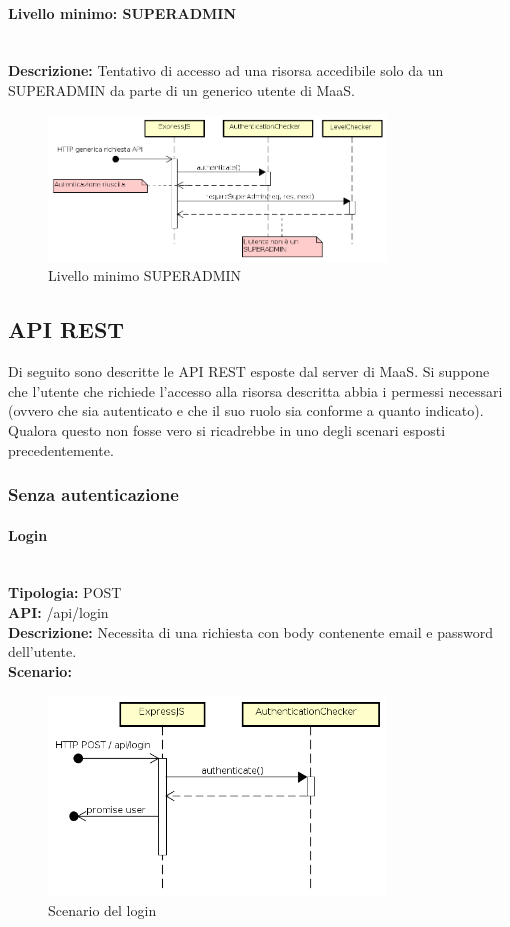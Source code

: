 \paragraph{Livello minimo: SUPERADMIN}  \mbox{} \\
\textbf{Descrizione:} Tentativo di accesso ad una risorsa accedibile solo da un SUPERADMIN da parte di un generico utente di MaaS.
\begin{figure}[H]
\centering
\includegraphics[width=0.8\textwidth]{res/sections/backend/sequence/requireSuperAdminFallita.png}
\caption{Livello minimo SUPERADMIN}
\end{figure}
\newpage
\subsection{API REST}
Di seguito sono descritte le API REST esposte dal server di MaaS. Si suppone che l'utente che richiede l'accesso alla risorsa descritta abbia i permessi necessari (ovvero che sia autenticato e che il suo ruolo sia conforme a quanto indicato). Qualora questo non fosse vero si ricadrebbe in uno degli scenari esposti precedentemente.
\subsubsection{Senza autenticazione}
\paragraph{Login}\mbox{}\\
\textbf{Tipologia:} POST \\
\textbf{API:} /api/login \\
\textbf{Descrizione:} Necessita di una richiesta con body contenente email e password dell'utente. \\
\textbf{Scenario:} 
\begin{figure}[H]
\centering
\includegraphics[width=0.8\textwidth]{res/sections/backend/sequence/(POST)login.png}
\caption{Scenario del login}
\end{figure}

